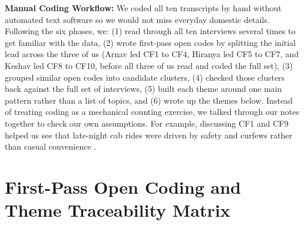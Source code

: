 \documentclass[12pt, a4paper]{article}
\begin{document}
\textbf{Manual Coding Workflow:} We coded all ten transcripts by hand without automated text software so we would not miss everyday domestic details. Following the six phases, we: (1) read through all ten interviews several times to get familiar with the data, (2) wrote first-pass open codes by splitting the initial lead across the three of us (Arnav led CF1 to CF4, Hiranya led CF5 to CF7, and Keshav led CF8 to CF10, before all three of us read and coded the full set), (3) grouped similar open codes into candidate clusters, (4) checked those clusters back against the full set of interviews, (5) built each theme around one main pattern rather than a list of topics, and (6) wrote up the themes below. Instead of treating coding as a mechanical counting exercise, we talked through our notes together to check our own assumptions. For example, discussing CF1 and CF9 helped us see that late-night cab rides were driven by safety and curfews rather than casual convenience \cite{cf1, cf9}.

\section{First-Pass Open Coding and Theme Traceability Matrix}
\end{document}
